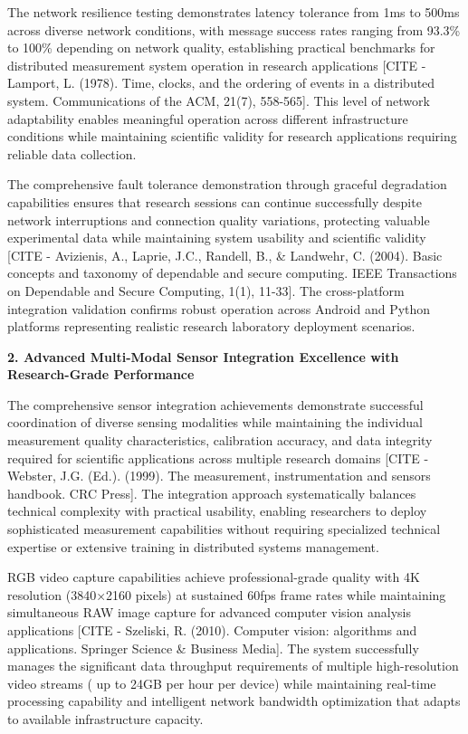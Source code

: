 \documentclass[11pt,a4paper]{report}
\begin{document}
The network resilience testing demonstrates latency tolerance from 1ms to 500ms across diverse network conditions, with
message success rates ranging from 93.3\% to 100\% depending on network quality, establishing practical benchmarks for
distributed measurement system operation in research
applications [CITE - Lamport, L. (1978). Time, clocks, and the ordering of events in a distributed system. Communications of the ACM, 21(7), 558-565].
This level of network adaptability enables meaningful operation across different infrastructure conditions while
maintaining scientific validity for research applications requiring reliable data collection.

The comprehensive fault tolerance demonstration through graceful degradation capabilities ensures that research sessions
can continue successfully despite network interruptions and connection quality variations, protecting valuable
experimental data while maintaining system usability and scientific
validity [CITE - Avizienis, A., Laprie, J.C., Randell, B., \& Landwehr, C. (2004). Basic concepts and taxonomy of dependable and secure computing. IEEE Transactions on Dependable and Secure Computing, 1(1), 11-33].
The cross-platform integration validation confirms robust operation across Android and Python platforms representing
realistic research laboratory deployment scenarios.

\textbf{2. Advanced Multi-Modal Sensor Integration Excellence with Research-Grade Performance}

The comprehensive sensor integration achievements demonstrate successful coordination of diverse sensing modalities
while maintaining the individual measurement quality characteristics, calibration accuracy, and data integrity required
for scientific applications across multiple research
domains [CITE - Webster, J.G. (Ed.). (1999). The measurement, instrumentation and sensors handbook. CRC Press]. The
integration approach systematically balances technical complexity with practical usability, enabling researchers to
deploy sophisticated measurement capabilities without requiring specialized technical expertise or extensive training in
distributed systems management.

RGB video capture capabilities achieve professional-grade quality with 4K resolution (3840×2160 pixels) at sustained
60fps frame rates while maintaining simultaneous RAW image capture for advanced computer vision analysis
applications [CITE - Szeliski, R. (2010). Computer vision: algorithms and applications. Springer Science \& Business Media].
The system successfully manages the significant data throughput requirements of multiple high-resolution video streams (
up to 24GB per hour per device) while maintaining real-time processing capability and intelligent network bandwidth
optimization that adapts to available infrastructure capacity.
\end{document}
